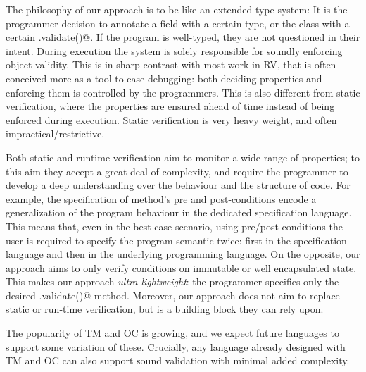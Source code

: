 \loseSpace
The philosophy of our approach is to be like an extended type system: 
It is the programmer decision
to annotate a field with a certain type,
or the class with a certain \Q@.validate()@.
If the program is well-typed, they are not questioned in their intent.
During execution the system is solely responsible for soundly enforcing object validity.
This is in sharp contrast with most work in RV, that is often conceived more as a tool to ease debugging:
both deciding properties and enforcing them is controlled by the programmers.
This is also different from static verification,
where the properties are ensured ahead of time instead of being enforced during execution.
Static verification is very heavy weight, and often impractical/restrictive.

Both static and runtime verification
aim to monitor a wide range of properties; to this aim they accept a 
great deal of complexity, and require the programmer to develop a deep understanding
over the behaviour and the structure of code.
For example, the specification of method’s pre and post-conditions
encode a generalization of the program behaviour in the dedicated specification language.
This means that, even in the best case scenario, 
using pre/post-conditions the user is required to specify the program semantic twice:
first in the specification language and then in the underlying programming language.
On the opposite, our approach aims to only verify conditions on immutable or well encapsulated state.
This makes our approach \emph{ultra-lightweight}:
the programmer specifies only the desired \Q@.validate()@ method.
Moreover, our approach does not aim to replace static or run-time verification,
but is a building block they can rely upon.

The popularity of TM and OC is growing, and we expect future languages to support some variation of these.
Crucially, any language already designed with TM and OC
can also support sound validation with minimal added complexity.